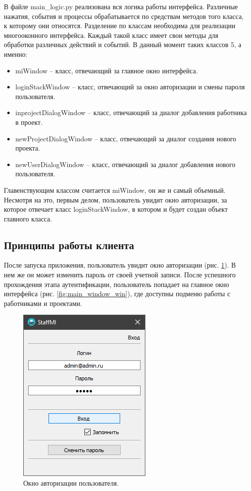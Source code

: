 \documentclass[14pt, a4paper]{extarticle}
\begin{document}
    

    В файле main\_logic.py реализована вся логика работы интерфейса. Различные нажатия, события и процессы обрабатывается по средствам методов того класса, к которому они относятся. Разделение по классам необходима для реализации многооконного интерфейса. Каждый такой класс имеет свои методы для обработки различных действий и событий. В данный момент таких классов 5, а именно:
    \begin{itemize}
        \item miWindow – класс, отвечающий за главное окно интерфейса.
        \item loginStackWindow – класс, отвечающий за окно авторизации и смены пароля пользователя.
        \item inprojectDialogWindow – класс, отвечающий за диалог добавления работника в проект.
        \item newProjectDialogWindow – класс, отвечающий за диалог создания нового проекта.
        \item newUserDialogWindow – класс, отвечающий за диалог добавления нового пользователя.
    \end{itemize}

    Главенствующим классом считается miWindow, он же и самый объемный. Несмотря на это, первым делом, пользователь увидит окно авторизации, за которое отвечает класс loginStackWindow, в котором и будет создан объект главного класса.


    \clearpage
    \subsection{Принципы работы клиента}
    После запуска приложения, пользователь увидит окно авторизации (рис. \ref{fig:auth_window_win}). В нем же он может изменить пароль от своей учетной записи. После успешного прохождения этапа аутентификации, пользователь попадает на главное окно интерфейса (рис. \ref{fig:main_window_win}), где доступны подменю работы с работниками и проектами.
    
    \begin{figure}[h]
        \centering
        \includegraphics[width=0.4\linewidth]{img/auth_window_win.png}
        \caption{Окно авторизации пользователя.}
        \label{fig:auth_window_win}
    \end{figure}
\end{document}
